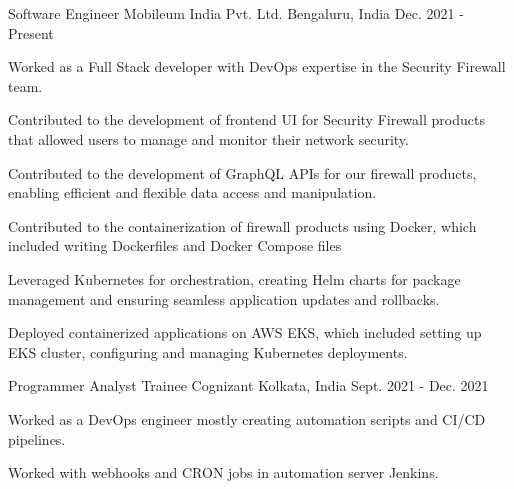 

\begin{cventries}


  \cventry
    {Software Engineer} %
    {Mobileum India Pvt. Ltd.} %
    {Bengaluru, India} %
    {Dec. 2021 - Present} %
    {
      \begin{cvitems} %
        \item {Worked as a Full Stack developer with DevOps expertise in the Security Firewall team.}
        \item {Contributed to the development of frontend UI for Security Firewall products that allowed users to manage and monitor their network security.}
        \item {Contributed to the development of GraphQL APIs for our firewall products, enabling efficient and flexible data access and manipulation.}
        \item {Contributed to the containerization of firewall products using Docker, which included writing Dockerfiles and Docker Compose files}
        \item {Leveraged Kubernetes for orchestration, creating Helm charts for package management and ensuring seamless application updates and rollbacks.}
        \item {Deployed containerized applications on AWS EKS, which included setting up EKS cluster, configuring and managing Kubernetes deployments.}
      \end{cvitems}
    }


  \cventry
    {Programmer Analyst Trainee} %
    {Cognizant} %
    {Kolkata, India} %
    {Sept. 2021 - Dec. 2021} %
    {
      \begin{cvitems} %
        \item {Worked as a DevOps engineer mostly creating automation scripts and CI/CD pipelines.}
        \item {Worked with webhooks and CRON jobs in automation server Jenkins.}
      \end{cvitems}
    }

\end{cventries}

